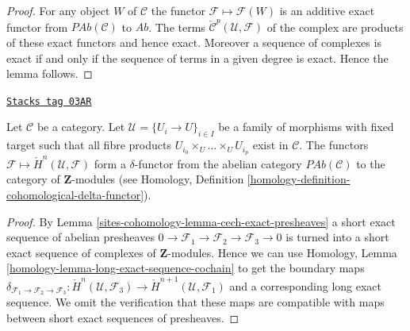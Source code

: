 \begin{proof}
For any object $W$ of $\mathcal{C}$ the functor
$\mathcal{F} \mapsto \mathcal{F}(W)$ is an additive exact functor
from $\textit{PAb}(\mathcal{C})$ to $\textit{Ab}$.
The terms $\check{\mathcal{C}}^p(\mathcal{U}, \mathcal{F})$
of the complex are products of these exact functors and hence exact.
Moreover a sequence of complexes is exact if and only if the sequence
of terms in a given degree is exact. Hence the lemma follows.
\end{proof}

\begin{lemma}
\label{sites-cohomology-lemma-cech-cohomology-delta-functor-presheaves}
\href{https://stacks.math.columbia.edu/tag/03AR}{\texttt{Stacks tag 03AR}}

Let $\mathcal{C}$ be a category.
Let $\mathcal{U} = \{U_i \to U\}_{i \in I}$ be a family of morphisms
with fixed target such that all fibre products
$U_{i_0} \times_U \ldots \times_U U_{i_p}$ exist in $\mathcal{C}$.
The functors $\mathcal{F} \mapsto \check{H}^n(\mathcal{U}, \mathcal{F})$
form a $\delta$-functor from the abelian category $\textit{PAb}(\mathcal{C})$
to the category of $\mathbf{Z}$-modules (see
Homology, Definition \ref{homology-definition-cohomological-delta-functor}).
\end{lemma}

\begin{proof}
By
Lemma \ref{sites-cohomology-lemma-cech-exact-presheaves}
a short exact sequence of abelian presheaves
$0 \to \mathcal{F}_1 \to \mathcal{F}_2 \to \mathcal{F}_3 \to 0$
is turned into a short exact sequence of complexes of
$\mathbf{Z}$-modules. Hence we can use
Homology, Lemma \ref{homology-lemma-long-exact-sequence-cochain}
to get the boundary maps
$\delta_{\mathcal{F}_1 \to \mathcal{F}_2 \to \mathcal{F}_3} :
\check{H}^n(\mathcal{U}, \mathcal{F}_3) \to
\check{H}^{n + 1}(\mathcal{U}, \mathcal{F}_1)$
and a corresponding long exact sequence. We omit the verification
that these maps are compatible with maps between short exact
sequences of presheaves.
\end{proof}

